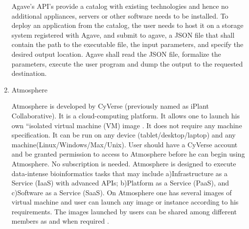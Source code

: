 \begin{enumerate}
Agave’s API’s provide a catalog with existing technologies and
hence no additional appliances, servers or other software needs
to be installed. To deploy an application from the catalog, the
user needs to host it on a storage system registered with Agave,
and submit to agave, a JSON file that shall contain the path to
the executable file, the input parameters, and specify the
desired output location. \label{\detokenize{i524/technologies:id204}}{\hyperref[\detokenize{i524/technologies:agave-paper}]{\sphinxcrossref{{[}174{]}}}} Agave shall read the
JSON file, formalize the parameters, execute the user program and
dump the output to the requested destination.

\item {} 
Atmosphere

Atmosphere is developed by CyVerse (previously named as iPlant
Collaborative).  It is a cloud-computing platform. It allows one
to launch his own “isolated virtual machine (VM) image
\label{\detokenize{i524/technologies:id205}}{\hyperref[\detokenize{i524/technologies:www-at1}]{\sphinxcrossref{{[}176{]}}}}.  It does not require any machine
specification. It can be run on any device
(tablet/desktop/laptop) and any machine(Linux/Windows/Max/Unix).
User should have a CyVerse account and be granted permission to
access to Atmosphere before he can begin using Atmosphere. No
subscription is needed.  Atmosphere is designed to execute
data-intense bioinformatics tasks that may include
a)Infrastructure as a Service (IaaS) with advanced APIs;
b)Platform as a Service (PaaS), and c)Software as a Service
(SaaS).  On Atmosphere one has several images of virtual machine
and user can launch any image or instance according to his
requirements.  The images launched by users can be shared among
different members as and when required \label{\detokenize{i524/technologies:id206}}{\hyperref[\detokenize{i524/technologies:www-at2}]{\sphinxcrossref{{[}177{]}}}}.

\end{enumerate}



